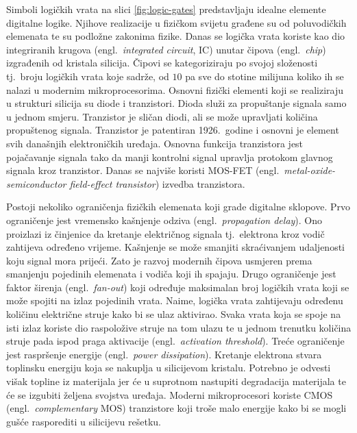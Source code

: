 \documentclass[times, utf8, diplomski]{fer}
\begin{document}
Simboli logičkih vrata na slici \ref{fig:logic-gates} predstavljaju idealne elemente digitalne logike. Njihove realizacije u fizičkom svijetu građene su od poluvodičkih elemenata te su podložne zakonima fizike. Danas se logička vrata koriste kao dio integriranih krugova (engl.~\textit{integrated circuit}, IC) unutar čipova (engl.~\textit{chip}) izgrađenih od kristala silicija. Čipovi se kategoriziraju po svojoj složenosti tj.~broju logičkih vrata koje sadrže, od $10$ pa sve do stotine milijuna koliko ih se nalazi u modernim mikroprocesorima. Osnovni fizički elementi koji se realiziraju u strukturi silicija su diode i tranzistori. Dioda služi za propuštanje signala samo u jednom smjeru. Tranzistor je sličan diodi, ali se može upravljati količina propuštenog signala. Tranzistor je patentiran 1926.~godine i osnovni je element svih današnjih elektroničkih uređaja. Osnovna funkcija tranzistora jest pojačavanje signala tako da manji kontrolni signal upravlja protokom glavnog signala kroz tranzistor. Danas se najviše koristi MOS-FET (engl.~\textit{metal-oxide-semiconductor field-effect transistor}) izvedba tranzistora.

Postoji nekoliko ograničenja fizičkih elemenata koji grade digitalne sklopove. Prvo ograničenje jest vremensko kašnjenje odziva (engl.~\textit{propagation delay}). Ono proizlazi iz činjenice da kretanje električnog signala tj.~elektrona kroz vodič zahtijeva određeno vrijeme. Kašnjenje se može smanjiti skraćivanjem udaljenosti koju signal mora prijeći. Zato je razvoj modernih čipova usmjeren prema smanjenju pojedinih elemenata i vodiča koji ih spajaju. Drugo ograničenje jest faktor širenja (engl.~\textit{fan-out}) koji određuje maksimalan broj logičkih vrata koji se može spojiti na izlaz pojedinih vrata. Naime, logička vrata zahtijevaju određenu količinu električne struje kako bi se ulaz aktivirao. Svaka vrata koja se spoje na isti izlaz koriste dio raspoložive struje na tom ulazu te u jednom trenutku količina struje pada ispod praga aktivacije (engl.~\textit{activation threshold}). Treće ograničenje jest raspršenje energije (engl.~\textit{power dissipation}). Kretanje elektrona stvara toplinsku energiju koja se nakuplja u silicijevom kristalu. Potrebno je odvesti višak topline iz materijala jer će u suprotnom nastupiti degradacija materijala te će se izgubiti željena svojstva uređaja. Moderni mikroprocesori koriste CMOS (engl.~\textit{complementary} MOS) tranzistore koji troše malo energije kako bi se mogli gušće rasporediti u silicijevu rešetku.
\end{document}
